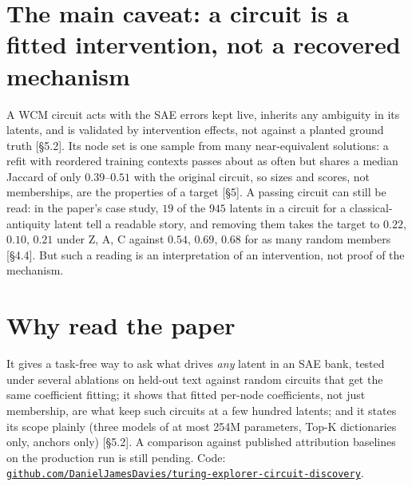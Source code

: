 \documentclass[10pt]{article}
\newcommand{\paperref}[1]{{\small[#1]}}
\begin{document}
\section*{The main caveat: a circuit is a fitted intervention, not a recovered mechanism}
A WCM circuit acts with the SAE errors kept live, inherits any ambiguity in its latents, and is validated by intervention effects, not against a planted ground truth \paperref{§5.2}.
Its node set is one sample from many near-equivalent solutions: a refit with reordered training contexts passes about as often but shares a median Jaccard of only $0.39$--$0.51$ with the original circuit, so sizes and scores, not memberships, are the properties of a target \paperref{§5}.
A passing circuit can still be read: in the paper's case study, $19$ of the $945$ latents in a circuit for a classical-antiquity latent tell a readable story, and removing them takes the target to $0.22$, $0.10$, $0.21$ under Z, A, C against $0.54$, $0.69$, $0.68$ for as many random members \paperref{§4.4}. But such a reading is an interpretation of an intervention, not proof of the mechanism.

\section*{Why read the paper}
It gives a task-free way to ask what drives \emph{any} latent in an SAE bank, tested under several ablations on held-out text against random circuits that get the same coefficient fitting; it shows that fitted per-node coefficients, not just membership, are what keep such circuits at a few hundred latents; and it states its scope plainly (three models of at most 254M parameters, Top-K dictionaries only, anchors only) \paperref{§5.2}.
A comparison against published attribution baselines on the production run is still pending.
Code: \href{https://github.com/DanielJamesDavies/turing-explorer-circuit-discovery}{\nolinkurl{github.com/DanielJamesDavies/turing-explorer-circuit-discovery}}.
\end{document}
